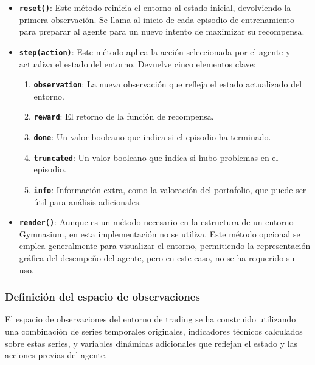 \documentclass[a4paper,12pt, twoside]{report}
\begin{document}
\begin{itemize}
    \begin{itemize}
        \item \textbf{\texttt{reset()}}: Este método reinicia el entorno al estado inicial, devolviendo la primera observación. Se llama al inicio de cada episodio de entrenamiento para preparar al agente para un nuevo intento de maximizar su recompensa.
        
        \item \textbf{\texttt{step(action)}}: Este método aplica la acción seleccionada por el agente y actualiza el estado del entorno. Devuelve cinco elementos clave:
        \begin{enumerate}
            \item \textbf{\texttt{observation}}: La nueva observación que refleja el estado actualizado del entorno.
            \item \textbf{\texttt{reward}}: El retorno de la función de recompensa.
            \item \textbf{\texttt{done}}: Un valor booleano que indica si el episodio ha terminado.
            \item \textbf{\texttt{truncated}}: Un valor booleano que indica si hubo problemas en el episodio.
            \item \textbf{\texttt{info}}: Información extra, como la valoración del portafolio, que puede ser útil para análisis adicionales.
        \end{enumerate}

        \item \textbf{\texttt{render()}}: Aunque es un método necesario en la estructura de un entorno Gymnasium, en esta implementación no se utiliza. Este método opcional se emplea generalmente para visualizar el entorno, permitiendo la representación gráfica del desempeño del agente, pero en este caso, no se ha requerido su uso.
    \end{itemize}
\end{itemize}

\subsubsection{Definición del espacio de observaciones}
\label{sec:espacio_observaciones}

El espacio de observaciones del entorno de trading se ha construido utilizando una 
combinación de series temporales originales, indicadores técnicos calculados sobre 
estas series, y variables dinámicas adicionales que reflejan el estado y las acciones 
previas del agente. 
\end{document}

